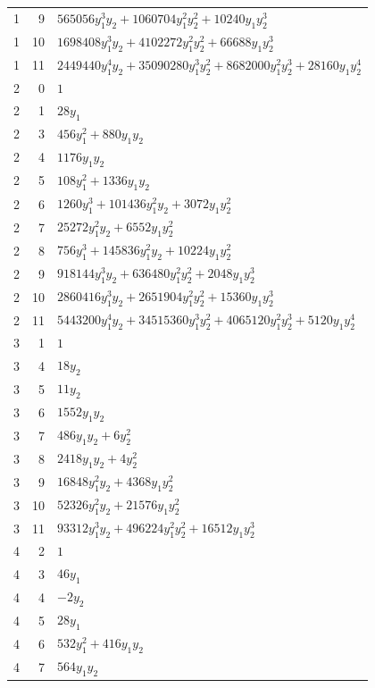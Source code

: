 \documentclass[10pt,a4paper]{article}
\begin{document}
{\begin{longtable}{rrp{125mm}}
1 & 9 & $565056 y_{1}^{3} y_{2} + 1060704 y_{1}^{2} y_{2}^{2} + 10240 y_{1} y_{2}^{3}$\\
1 & 10 & $1698408 y_{1}^{3} y_{2} + 4102272 y_{1}^{2} y_{2}^{2} + 66688 y_{1} y_{2}^{3}$\\
1 & 11 & $2449440 y_{1}^{4} y_{2} + 35090280 y_{1}^{3} y_{2}^{2} + 8682000 y_{1}^{2} y_{2}^{3} + 28160 y_{1} y_{2}^{4}$\\
2 & 0 & $1$\\
2 & 1 & $28 y_{1}$\\
2 & 3 & $456 y_{1}^{2} + 880 y_{1} y_{2}$\\
2 & 4 & $1176 y_{1} y_{2}$\\
2 & 5 & $108 y_{1}^{2} + 1336 y_{1} y_{2}$\\
2 & 6 & $1260 y_{1}^{3} + 101436 y_{1}^{2} y_{2} + 3072 y_{1} y_{2}^{2}$\\
2 & 7 & $25272 y_{1}^{2} y_{2} + 6552 y_{1} y_{2}^{2}$\\
2 & 8 & $756 y_{1}^{3} + 145836 y_{1}^{2} y_{2} + 10224 y_{1} y_{2}^{2}$\\
2 & 9 & $918144 y_{1}^{3} y_{2} + 636480 y_{1}^{2} y_{2}^{2} + 2048 y_{1} y_{2}^{3}$\\
2 & 10 & $2860416 y_{1}^{3} y_{2} + 2651904 y_{1}^{2} y_{2}^{2} + 15360 y_{1} y_{2}^{3}$\\
2 & 11 & $5443200 y_{1}^{4} y_{2} + 34515360 y_{1}^{3} y_{2}^{2} + 4065120 y_{1}^{2} y_{2}^{3} + 5120 y_{1} y_{2}^{4}$\\
3 & 1 & $1$\\
3 & 4 & $18 y_{2}$\\
3 & 5 & $11 y_{2}$\\
3 & 6 & $1552 y_{1} y_{2}$\\
3 & 7 & $486 y_{1} y_{2} + 6 y_{2}^{2}$\\
3 & 8 & $2418 y_{1} y_{2} + 4 y_{2}^{2}$\\
3 & 9 & $16848 y_{1}^{2} y_{2} + 4368 y_{1} y_{2}^{2}$\\
3 & 10 & $52326 y_{1}^{2} y_{2} + 21576 y_{1} y_{2}^{2}$\\
3 & 11 & $93312 y_{1}^{3} y_{2} + 496224 y_{1}^{2} y_{2}^{2} + 16512 y_{1} y_{2}^{3}$\\
4 & 2 & $1$\\
4 & 3 & $46 y_{1}$\\
4 & 4 & $- 2 y_{2}$\\
4 & 5 & $28 y_{1}$\\
4 & 6 & $532 y_{1}^{2} + 416 y_{1} y_{2}$\\
4 & 7 & $564 y_{1} y_{2}$\\

\end{longtable}}
\end{document}
